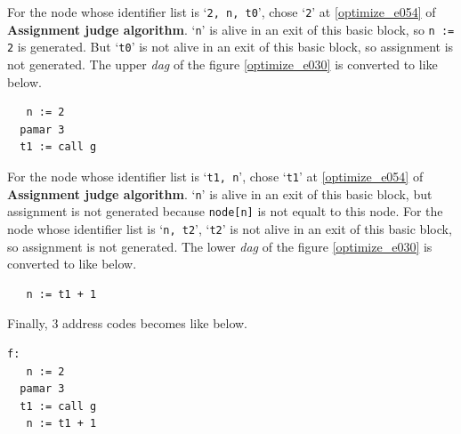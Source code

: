\begin{Example}
For the node whose identifier list is `{\tt{2, n, t0}}',
chose `{\tt{2}}' at \ref{optimize_e054} of {\bf Assignment judge
 algorithm}.
`{\tt{n}}' is alive in an exit of this basic block, so
{\tt{n := 2}} is generated. But
`{\tt{t0}}' is not alive in an exit of this basic block, so
assignment is not generated.
The upper {\em dag} of the figure \ref{optimize_e030} 
is converted to like below.
\begin{verbatim}
   n := 2
  pamar 3
  t1 := call g
\end{verbatim}
For the node whose identifier list is `{\tt{t1, n}}',
chose `{\tt{t1}}' at \ref{optimize_e054} of {\bf Assignment judge
 algorithm}.
`{\tt{n}}' is alive in an exit of this basic block, but
assignment is not generated because {\tt{node[n]}} is
not equalt to this node.
For the node whose identifier list is `{\tt{n, t2}}',
`{\tt{t2}}' is not alive in an exit of this basic block, 
so assignment is not generated.
The lower {\em dag} of the figure \ref{optimize_e030} 
is converted to like below.
\begin{verbatim}
   n := t1 + 1
\end{verbatim}
Finally, 3 address codes becomes like below.
\begin{verbatim}
f:
   n := 2
  pamar 3
  t1 := call g
   n := t1 + 1
\end{verbatim}
\end{Example}

